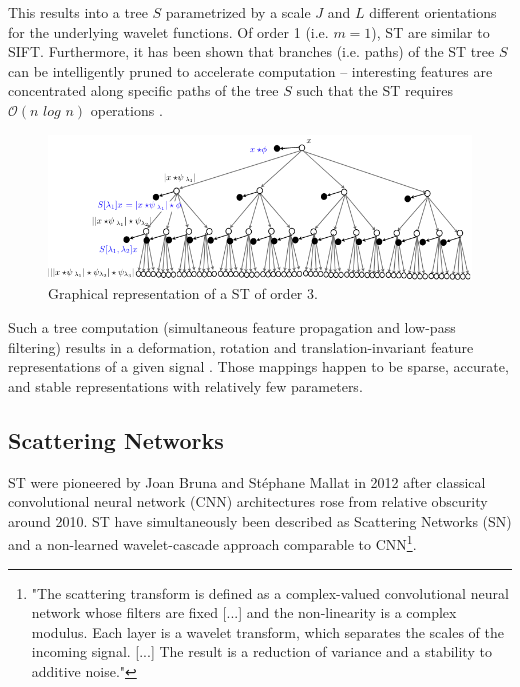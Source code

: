 \documentclass[runningheads]{llncs}
\begin{document}
This results into a tree $S$ parametrized by a scale $J$ and $L$ different orientations for the underlying wavelet functions\cite{oyallon}. Of order 1 (i.e. $m=1$), ST are similar to SIFT\cite{lowe}. Furthermore, it has been shown that branches (i.e. paths) of the ST tree $S$ can be intelligently pruned to accelerate computation -- interesting features are concentrated along specific paths of the tree $S$ such that the ST requires $\mathcal{O}(n\,\,log\,\,n)$ operations \cite{bruna2012invariant}\cite{oyallon}.
\begin{figure}
\centering\includegraphics[width=\textwidth]{graph_rep.png}
\caption{Graphical representation of a ST of order 3\cite{mallatlecture}.} \label{fig2}
\end{figure}
Such a tree computation (simultaneous feature propagation and low-pass filtering\cite{DSN}) results in a deformation, rotation and translation-invariant feature representations of a given signal \cite{mallatgroup}\cite{mallatIEEE}\cite{mallatlecture}. Those mappings happen to be sparse, accurate, and stable representations with relatively few parameters\cite{bruna2012invariant}.

\subsection{Scattering Networks}

ST were pioneered by Joan Bruna and Stéphane Mallat in 2012 after classical convolutional neural network (CNN) architectures rose from relative obscurity around 2010\cite{lecun}. ST have simultaneously been described as Scattering Networks (SN) and a non-learned wavelet-cascade approach comparable to CNN\footnote{"The scattering transform is defined as a complex-valued convolutional neural network whose filters are fixed [...] and the non-linearity is a complex modulus. Each layer is a wavelet transform, which separates the scales of the incoming signal. [...] The result is a reduction of variance and a stability to additive noise\cite{andreux}."}\cite{bruna2012invariant}\cite{mallatIEEE}\cite{mallatlecture}\cite{DSN}.
\end{document}
